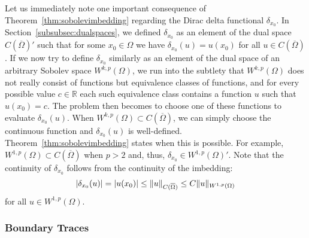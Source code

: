 \documentclass[english, 12pt, a4paper, sci, utf8, a-2b, online]{aaltothesis}
\theoremstyle{definition}
\theoremstyle{plain}
\DeclarePairedDelimiter\abs{\lvert}{\rvert}
\DeclarePairedDelimiter\norm{\lVert}{\rVert}
\numberwithin{equation}{section}
\begin{document}
Let us immediately note one important consequence of 
Theorem~\ref{thm:sobolevimbedding} regarding the Dirac delta functional
$\delta_{x_0}$. In Section~\ref{subsubsec:dualspaces}, we defined $\delta_{x_0}$
as an element of the dual space $C(\overline{\Omega})'$ such that
for some $x_0 \in \Omega$ we have $\delta_{x_0}(u) = u(x_0)$
for all $u \in C(\overline{\Omega})$.
If we now try to define $\delta_{x_0}$ similarly as an element of the dual space
of an arbitrary Sobolev space $W^{k,p}(\Omega)$, we run into the subtlety
that $W^{k,p}(\Omega)$ does not really consist of functions but equivalence
classes of functions, and for every possible value $c \in \mathbb{R}$
each such equivalence class contains a function $u$ such that $u(x_0) = c$.
The problem then becomes to choose one of these functions to evaluate
$\delta_{x_0}(u)$. When $W^{k,p}(\Omega) \subset C(\overline{\Omega})$,
we can simply choose the continuous function and $\delta_{x_0}(u)$
is well-defined. Theorem~\ref{thm:sobolevimbedding} states when this is possible.
For example, $W^{1,p}(\Omega) \subset C(\overline{\Omega})$ when $p > 2$
and, thus, $\delta_{x_0} \in W^{1,p}(\Omega)'$. Note that the continuity
of $\delta_{x_0}$ follows from the continuity of the imbedding:
\begin{equation*}
    \abs{\delta_{x_0}(u)}
    = \abs{u(x_0)}
    \leq \norm{u}_{C(\overline{\Omega})}
    \leq C \norm{u}_{W^{1,p}(\Omega)}
\end{equation*}
for all $u \in W^{1,p}(\Omega)$.

\subsubsection{Boundary Traces}
\label{subsubsec:boundarytraces}
\end{document}
